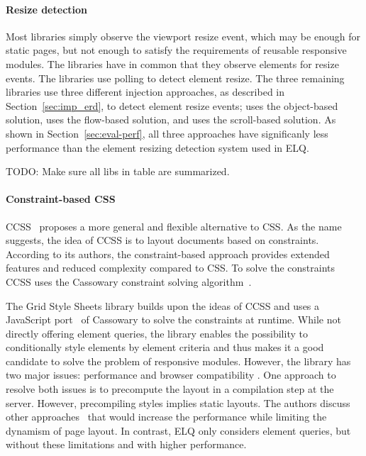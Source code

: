 \documentclass{acm_proc_article-sp}
\newcommand{\elq}{ELQ}
\newcommand{\gls}[1]{#1}
\begin{document}

  \paragraph{Resize detection}
  Most libraries simply observe the \gls{viewport} resize event, which may be enough for static pages, but not enough to satisfy the requirements of reusable responsive modules.
  The libraries \cite{eq_imp_localised-css,eq_imp_selector_queries,eq_imp_prollyfill-min-width,eq_imp_gss,eq_imp_element-queries,eq_imp_css-element-queries} have in common that they observe elements for resize events.
  The libraries \cite{eq_imp_localised-css,eq_imp_selector_queries} use polling to detect element resize.
  The three remaining libraries use three different injection approaches, as described in Section~\ref{sec:imp_erd}, to detect element resize events; \cite{eq_imp_element-queries} uses the object-based solution, \cite{eq_imp_prollyfill-min-width} uses the flow-based solution, and \cite{eq_imp_css-element-queries} uses the scroll-based solution.
  As shown in Section~\ref{sec:eval-perf}, all three approaches have significanly less performance than the element resizing detection system used in \gls{ELQ}.

  TODO: Make sure all libs in table are summarized.

  \paragraph{Constraint-based CSS}
  CCSS~\cite{badros1999constraint} proposes a more general and flexible alternative to CSS.
  As the name suggests, the idea of \gls{CCSS} is to layout documents based on constraints.
  According to its authors, the constraint-based approach provides extended features and reduced complexity compared to CSS.
  To solve the constraints CCSS uses the Cassowary constraint solving algorithm~\cite{cassowary}.

  The Grid Style Sheets library \cite{eq_imp_gss} builds upon the ideas of \gls{CCSS} and uses a \gls{JavaScript} port~\cite{cassowary_js} of Cassowary to solve the constraints at runtime.
  While not directly offering element queries, the library enables the possibility to conditionally style elements by \gls{element} criteria and thus makes it a good candidate to solve the problem of \gls{responsive} modules.
  However, the library has two major issues: performance and browser compatibility \cite{gss_issue}.
  One approach to resolve both issues is to precompute the layout in a compilation step at the server.
  However, precompiling styles implies static layouts.
  The authors discuss other approaches~\cite{gss_issue} that would increase the performance while limiting the dynamism of page layout.
  In contrast, \elq{} only considers element queries, but without these limitations and with higher performance.
\end{document}
